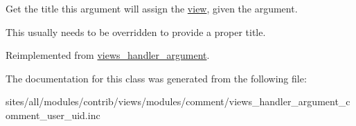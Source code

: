 Get the title this argument will assign the \hyperlink{classview}{view}, given the argument.

This usually needs to be overridden to provide a proper title. 

Reimplemented from \hyperlink{classviews__handler__argument_76181ac24e7be4a09aaafc1fa5f15ea1}{views\_\-handler\_\-argument}.

The documentation for this class was generated from the following file:\begin{CompactItemize}
\item 
sites/all/modules/contrib/views/modules/comment/views\_\-handler\_\-argument\_\-comment\_\-user\_\-uid.inc\end{CompactItemize}
